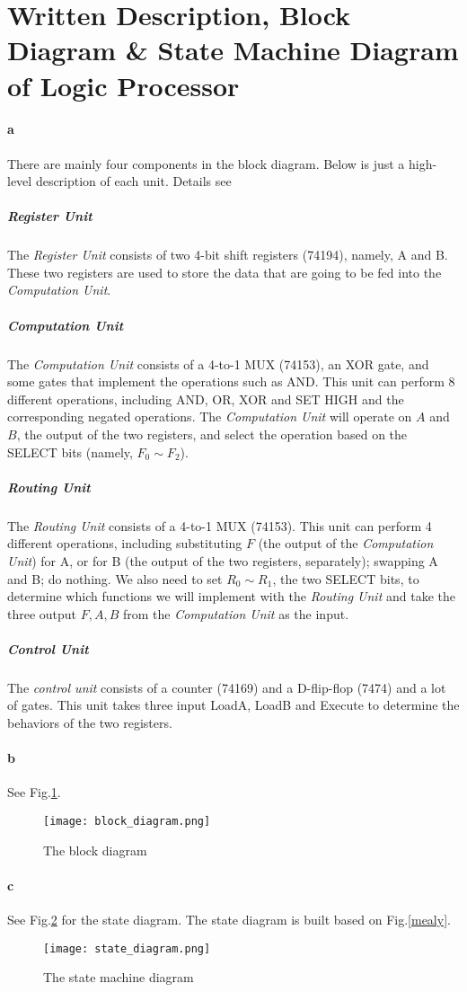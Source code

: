 \documentclass[12pt]{article}
\begin{document}
\section{Written Description, Block Diagram \& State Machine Diagram of Logic Processor}
\paragraph{a} There are mainly four components in the block diagram. Below is just a high-level description of each unit. Details see
\subparagraph{Register Unit} 
The \textit{Register Unit} consists of two 4-bit shift registers (74194), namely, A and B. These two registers are used to store the data that are going to be fed into the \textit{Computation Unit}.

\subparagraph{Computation Unit} The \textit{Computation Unit} consists of a 4-to-1 MUX (74153), an XOR gate, and some gates that implement the operations such as AND. This unit can perform 8 different operations, including AND, OR, XOR and SET HIGH and the corresponding negated operations. The \textit{Computation Unit} will operate on $A$ and $B$, the output of the two registers, and select the operation based on the SELECT bits (namely, $F_0\sim F_2$).

\subparagraph{Routing Unit} The \textit{Routing Unit} consists of a 4-to-1 MUX (74153). This unit can perform 4 different operations, including substituting $F$ (the output of the \textit{Computation Unit}) for A, or for B (the output of the two registers, separately); swapping A and B; do nothing. We also need to set $R_0\sim R_1$, the two SELECT bits, to determine which functions we will implement with the \textit{Routing Unit} and take the three output $F,A,B$ from the \textit{Computation Unit} as the input.

\subparagraph{Control Unit} The \textit{control unit} consists of a counter (74169) and a D-flip-flop (7474) and a lot of gates. This unit takes three input LoadA, LoadB and Execute to determine the behaviors of the two registers. 

\paragraph{b} See Fig.\ref{block diagram}.
\begin{figure}[h]
    \centering
    \texttt{[image: block\_diagram.png]}
    \caption{The block diagram}
    \label{block diagram}
\end{figure} 
\paragraph{c} See Fig.\ref{state diagram} for the state diagram. The state diagram is built based on Fig.\ref{mealy}.
\begin{figure}[h]
    \centering
    \texttt{[image: state\_diagram.png]}
    \caption{The state machine diagram}
    \label{state diagram}
\end{figure}
\end{document}

